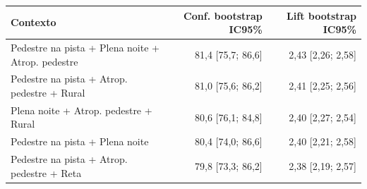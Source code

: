 \begin{tabular}{@{}>{\raggedright\arraybackslash}p{6.6cm}rr@{}}
\toprule
\textbf{Contexto} & \textbf{Conf. bootstrap IC95\%} & \textbf{Lift bootstrap IC95\%} \\
\midrule
Pedestre na pista + Plena noite + Atrop. pedestre & 81,4 [75,7; 86,6] & 2,43 [2,26; 2,58] \\
Pedestre na pista + Atrop. pedestre + Rural & 81,0 [75,6; 86,2] & 2,41 [2,25; 2,56] \\
Plena noite + Atrop. pedestre + Rural & 80,6 [76,1; 84,8] & 2,40 [2,27; 2,54] \\
Pedestre na pista + Plena noite & 80,4 [74,0; 86,6] & 2,40 [2,21; 2,58] \\
Pedestre na pista + Atrop. pedestre + Reta & 79,8 [73,3; 86,2] & 2,38 [2,19; 2,57] \\
\bottomrule
\end{tabular}